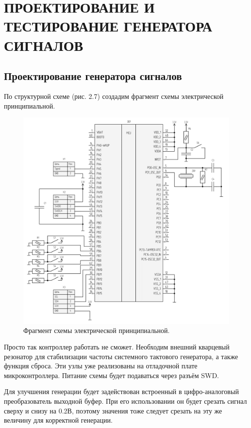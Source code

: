 \chapter{ПРОЕКТИРОВАНИЕ И ТЕСТИРОВАНИЕ ГЕНЕРАТОРА СИГНАЛОВ}
\section{Проектирование генератора сигналов}
	По структурной схеме (рис. 2.7) создадим фрагмент схемы электрической принципиальной. 
	
	\begin{figure}[H]
    \centering
    \includegraphics[width=1\textwidth]{../image/scheme-cropped.png}
    \caption{Фрагмент схемы электрической принципиальной.}
	\end{figure}
	
	Просто так контроллер работать не сможет. Необходим внешний кварцевый резонатор для стабилизации частоты системного тактового генератора, а также функция сброса. Эти узлы уже реализованы на отладочной плате микроконтроллера. Питание схемы будет подаваться через разъём SWD.
		
	Для улучшения генерации будет задействован встроенный в цифро-аналоговый преобразователь выходной буфер. При его использовании он будет срезать сигнал сверху и снизу на 0.2В, поэтому значения тоже следует срезать на эту же величину для корректной генерации.
	
